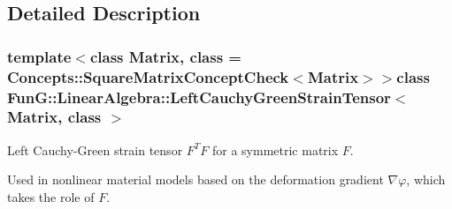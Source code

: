 \subsection{\-Detailed \-Description}
\subsubsection*{template$<$class Matrix, class = \-Concepts\-::\-Square\-Matrix\-Concept\-Check$<$\-Matrix$>$$>$class Fun\-G\-::\-Linear\-Algebra\-::\-Left\-Cauchy\-Green\-Strain\-Tensor$<$ Matrix, class $>$}

\-Left \-Cauchy-\/\-Green strain tensor $ F^T F $ for a symmetric matrix $ F $. 

\-Used in nonlinear material models based on the deformation gradient $\nabla\varphi$, which takes the role of $F$. 

